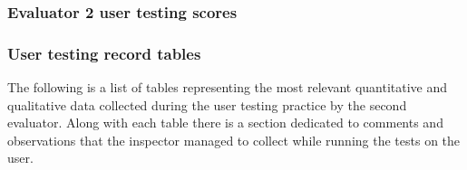 
\subsubsection{Evaluator 2 user testing scores}

\subsubsection*{User testing record tables}
The following is a list of tables representing the most relevant quantitative and qualitative data collected during the user testing practice by the second evaluator.
Along with each table there is a section dedicated to comments and observations that the inspector managed to collect while running the tests on the user.

\vspace{0.8cm}

